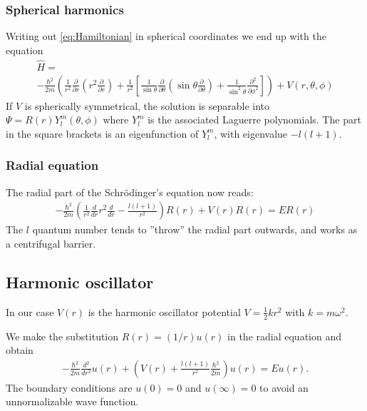 \documentclass[11pt,a4paper,english,draft]{article}
\numberwithin{equation}{section}
\let\oldhat\hat
\renewcommand{\hat}[1]{\oldhat{#1}}
\begin{document}
\subsubsection{Spherical harmonics}
Writing out \eqref{eq:Hamiltonian} in spherical coordinates we end up
with the equation
\begin{gather}
\nonumber \hat{H} = \\
-\frac{\hbar^2}{2m}\left(\frac{1}{r^2}\frac{\partial}{\partial r}
\left( r^2\frac{\partial }{\partial r}\right)
+ \frac{1}{r^2}\left[ \frac{1}{\sin\theta}\frac{\partial}{\partial \theta}
\left( \sin\theta \frac{\partial}{\partial \theta}\right)
+ \frac{1}{\sin^2\theta}\frac{\partial^2}{\partial \phi^2}
\right]\right) + V(r,\theta,\phi)
\end{gather}
If $V$ is spherically symmetrical, the solution is separable into
$\Psi = R(r)Y_l^m(\theta, \phi)$ where $Y_l^m$ is the associated Laguerre
polynomials. The part in the square brackets is an eigenfunction of 
$Y_l^m$, with eigenvalue $-l(l+1)$. 


\subsubsection{Radial equation}

The radial part of the Schrödinger's equation now reads:
\begin{gather}
  -\frac{\hbar^2}{2 m} \left ( \frac{1}{r^2} \frac{d}{dr} r^2
  \frac{d}{dr} - \frac{l (l + 1)}{r^2} \right )R(r) 
     + V(r) R(r) = E R(r)
\label{eq:radial}
\end{gather}
The $l$ quantum number tends to ''throw'' the radial part outwards,
and works as a centrifugal barrier.

\subsection{Harmonic oscillator}
In our case $V(r)$ is the harmonic oscillator potential 
$V = \frac{1}{2}k r^2$ with
$k=m\omega^2$. 

We make the substitution $R(r) = (1/r) u(r)$ in the radial
equation and obtain
\begin{gather}
  -\frac{\hbar^2}{2 m} \frac{d^2}{dr^2} u(r) 
       + \left ( V(r) + \frac{l (l + 1)}{r^2}\frac{\hbar^2}{2 m}
                                    \right ) u(r)  = E u(r) .
\end{gather}
The boundary conditions are $u(0)=0$ and $u(\infty)=0$ to avoid
an unnormalizable wave function.
\end{document}
